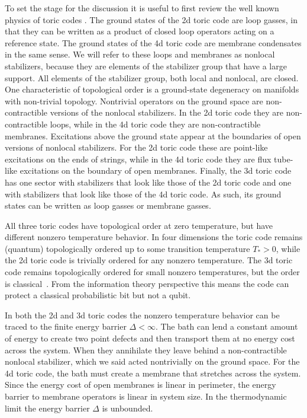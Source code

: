 To set the stage for the discussion it is useful to first review the well known physics of toric codes \cite{Kitaev2003Fault}. The ground states of the 2d toric code are loop gasses, in that they can be written as a product of closed loop operators acting on a reference state. The ground states of the 4d toric code are membrane condensates in the same sense. We will refer to these loops and membranes as nonlocal stabilizers, because they are elements of the stabilizer group that have a large support. All elements of the stabilizer group, both local and nonlocal, are closed. One characteristic of topological order is a ground-state degeneracy on manifolds with non-trivial topology. Nontrivial operators on the ground space are non-contractible versions of the nonlocal stabilizers. In the 2d toric code they are non-contractible loops, while in the 4d toric code they are non-contractible membranes. Excitations above the ground state appear at the boundaries of open versions of nonlocal stabilizers. For the 2d toric code these are point-like excitations on the ends of strings, while in the 4d toric code they are flux tube-like excitations on the boundary of open membranes. Finally, the 3d toric code has one sector with stabilizers that look like those of the 2d toric code and one with stabilizers that look like those of the 4d toric code. As such, its ground states can be written as loop gasses or membrane gasses.
	
All three toric codes have topological order at zero temperature, but have different nonzero temperature behavior. In four dimensions the toric code remains (quantum) topologically ordered up to some transition temperature $T_*>0$, while the 2d toric code is trivially ordered for any nonzero temperature. The 3d toric code remains topologically ordered for small nonzero temperatures, but the order is classical~\cite{CastelnovoChamon2008}. From the information theory perspective this means the code can protect a classical probabilistic bit 
but not a qubit. 
	
In both the 2d and 3d toric codes the nonzero temperature behavior can be traced to the finite energy barrier $\Delta<\infty$. The bath can lend a constant amount of energy to create two point defects and then transport them at no energy cost across the system. When they annihilate they leave behind a non-contractible nonlocal stabilizer, which we said acted nontrivially on the ground space. For the 4d toric code, the bath must create a membrane that stretches across the system. Since the energy cost of open membranes is linear in perimeter, the energy barrier to membrane operators is linear in system size. In the thermodynamic limit the energy barrier $\Delta$ is unbounded.

